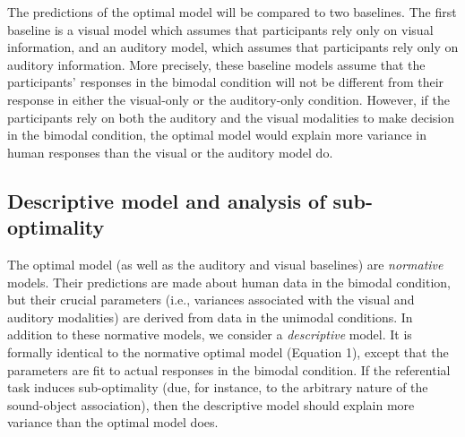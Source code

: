 \documentclass[english,floatsintext,man]{apa6}
\theoremstyle{definition}
\theoremstyle{definition}
\theoremstyle{definition}
\theoremstyle{remark}
\begin{document}
The predictions of the optimal model will be compared to two baselines.
The first baseline is a visual model which assumes that participants
rely only on visual information, and an auditory model, which assumes
that participants rely only on auditory information. More precisely,
these baseline models assume that the participants' responses in the
bimodal condition will not be different from their response in either
the visual-only or the auditory-only condition. However, if the
participants rely on both the auditory and the visual modalities to make
decision in the bimodal condition, the optimal model would explain more
variance in human responses than the visual or the auditory model do.

\subsection{Descriptive model and analysis of
sub-optimality}\label{descriptive-model-and-analysis-of-sub-optimality}

The optimal model (as well as the auditory and visual baselines) are
\emph{normative} models. Their predictions are made about human data in
the bimodal condition, but their crucial parameters (i.e., variances
associated with the visual and auditory modalities) are derived from
data in the unimodal conditions. In addition to these normative models,
we consider a \emph{descriptive} model. It is formally identical to the
normative optimal model (Equation 1), except that the parameters are fit
to actual responses in the bimodal condition. If the referential task
induces sub-optimality (due, for instance, to the arbitrary nature of
the sound-object association), then the descriptive model should explain
more variance than the optimal model does.
\end{document}
